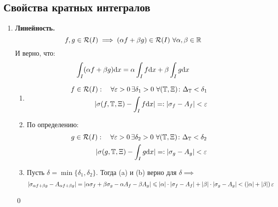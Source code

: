 \documentclass[a4paper, 10pt]{article}
\begin{document}
\subsection{Свойства кратных интегралов}
\begin{enumerate}
    \item \textbf{Линейность.}
    \begin{equation*}
        f, g \in \mathcal{R}(I) \implies (\alpha f + \beta g)\in \mathcal{R}(I)\ \forall \alpha, \beta \in \operatorname{\mathbb{R}}
    \end{equation*}
    И верно, что:
    \begin{equation*}
            \int_I(\alpha f + \beta g)\text{d}x = \alpha\int_I f\text{d}x + \beta\int_Ig\text{d}x
    \end{equation*}
\proof 
\begin{enumerate}
    \item
\begin{equation*}
\begin{aligned}
    f\in \mathcal{R}(I): \quad \forall \varepsilon > 0 \, \exists\delta_1>0\ \forall(\operatorname{\mathbb{T}},\Xi)\colon \Delta_{\operatorname{\mathbb{T}}} < \delta_1 \\
    |\sigma(f, \operatorname{\mathbb{T}}, \Xi)  - \int_If\text{d}x| =: |\sigma_f - A_f| <\varepsilon
\end{aligned}
\end{equation*}
\item По определению:
\begin{equation*}
    \begin{aligned}
        g\in \mathcal{R}(I): \quad \forall \varepsilon > 0 \, \exists\delta_2>0\ \forall(\operatorname{\mathbb{T}},\Xi)\colon \Delta_{\operatorname{\mathbb{T}}} < \delta_2\\
|\sigma(g, \operatorname{\mathbb{T}}, \Xi)  - \int_Ig\text{d}x| =: |\sigma_g - A_g| < \varepsilon
    \end{aligned}
\end{equation*}
\item Пусть $\delta = \min\{\delta_1, \delta_2\}$. Тогда (a) и (b) верно для $\delta \implies$
\begin{equation*}
    \begin{aligned}
        |\sigma_{\alpha f+\beta g} - A_{\alpha f+ \beta g}| = |\alpha\sigma_f + \beta\sigma_g - \alpha A_f - \beta A_g| \leqslant
        |\alpha|\cdot|\sigma_f - A_f| + |\beta|\cdot|\sigma_g-A_g| < (|\alpha|+|\beta|)\operatorname{\varepsilon} 
    \end{aligned}
\end{equation*}
\end{enumerate}
\qed


\end{enumerate}
\end{document}
